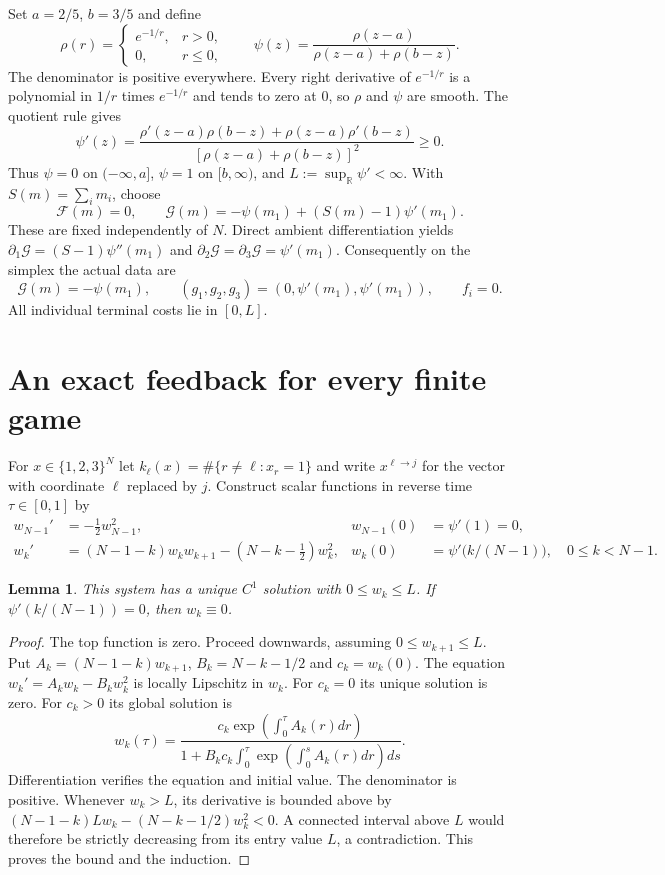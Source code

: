 \documentclass[11pt,a4paper]{article}
\newtheorem{lemma}{Lemma}
\newcommand{\R}{\mathbb R}
\begin{document}
Set $a=2/5$, $b=3/5$ and define
\[
 \rho(r)=\begin{cases}e^{-1/r},&r>0,\\0,&r\le0,\end{cases}
 \qquad
 \psi(z)=\frac{\rho(z-a)}{\rho(z-a)+\rho(b-z)}.
\]
The denominator is positive everywhere. Every right derivative of
$e^{-1/r}$ is a polynomial in $1/r$ times $e^{-1/r}$ and tends to zero
at $0$, so $\rho$ and $\psi$ are smooth. The quotient rule gives
\[
 \psi'(z)=\frac{\rho'(z-a)\rho(b-z)+\rho(z-a)\rho'(b-z)}
 {[\rho(z-a)+\rho(b-z)]^2}\ge0.
\]
Thus $\psi=0$ on $(-\infty,a]$, $\psi=1$ on $[b,\infty)$,
and $L:=\sup_\R\psi'<\infty$. With $S(m)=\sum_i m_i$, choose
\begin{equation}\label{data}
 \mathcal F(m)=0,\qquad
 \mathcal G(m)=-\psi(m_1)+(S(m)-1)\psi'(m_1).
\end{equation}
These are fixed independently of $N$. Direct ambient differentiation
yields $\partial_1\mathcal G=(S-1)\psi''(m_1)$ and
$\partial_2\mathcal G=\partial_3\mathcal G=\psi'(m_1)$. Consequently
on the simplex the actual data are
\begin{equation}\label{costs}
 \mathcal G(m)=-\psi(m_1),\qquad
 (g_1,g_2,g_3)=(0,\psi'(m_1),\psi'(m_1)),\qquad f_i=0.
\end{equation}
All individual terminal costs lie in $[0,L]$.

\section{An exact feedback for every finite game}
For $x\in\{1,2,3\}^N$ let
$k_\ell(x)=\#\{r\ne\ell:x_r=1\}$ and write $x^{\ell\to j}$ for
the vector with coordinate $\ell$ replaced by $j$.
Construct scalar functions in reverse time $\tau\in[0,1]$ by
\begin{align}
 w_{N-1}'&=-\tfrac12w_{N-1}^2,& w_{N-1}(0)&=\psi'(1)=0,\label{ode-top}\\
 w_k'&=(N-1-k)w_k w_{k+1}-(N-k-\tfrac12)w_k^2,
 &w_k(0)&=\psi'\bigl(k/(N-1)\bigr),\quad 0\le k<N-1.
 \label{ode}
\end{align}
\begin{lemma}\label{ode-lemma}
This system has a unique $C^1$ solution with $0\le w_k\le L$.
If $\psi'(k/(N-1))=0$, then $w_k\equiv0$.
\end{lemma}
\begin{proof}
The top function is zero. Proceed downwards, assuming
$0\le w_{k+1}\le L$. Put $A_k=(N-1-k)w_{k+1}$,
$B_k=N-k-1/2$ and $c_k=w_k(0)$. The equation
$w_k'=A_kw_k-B_kw_k^2$ is locally Lipschitz in $w_k$.
For $c_k=0$ its unique solution is zero. For $c_k>0$ its global solution is
\[
 w_k(\tau)=\frac{c_k\exp(\int_0^\tau A_k(r)dr)}
 {1+B_kc_k\int_0^\tau\exp(\int_0^s A_k(r)dr)ds}.
\]
Differentiation verifies the equation and initial value. The denominator
is positive. Whenever $w_k>L$, its derivative is bounded above by
$(N-1-k)Lw_k-(N-k-1/2)w_k^2<0$. A connected interval above $L$
would therefore be strictly decreasing from its entry value $L$,
a contradiction. This proves the bound and the induction.
\end{proof}
\end{document}
